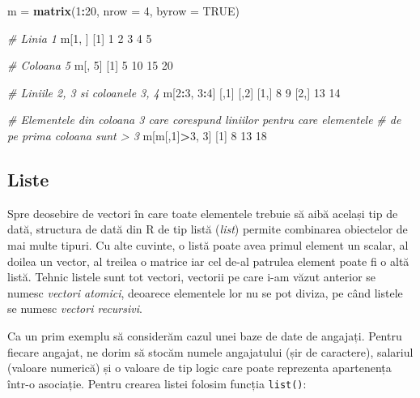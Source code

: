 \documentclass[]{article}
\newenvironment{Shaded}{\begin{snugshade}}{\end{snugshade}}
\newcommand{\KeywordTok}[1]{\textcolor[rgb]{0.13,0.29,0.53}{\textbf{#1}}}
\newcommand{\DataTypeTok}[1]{\textcolor[rgb]{0.13,0.29,0.53}{#1}}
\newcommand{\DecValTok}[1]{\textcolor[rgb]{0.00,0.00,0.81}{#1}}
\newcommand{\StringTok}[1]{\textcolor[rgb]{0.31,0.60,0.02}{#1}}
\newcommand{\CommentTok}[1]{\textcolor[rgb]{0.56,0.35,0.01}{\textit{#1}}}
\newcommand{\OtherTok}[1]{\textcolor[rgb]{0.56,0.35,0.01}{#1}}
\newcommand{\OperatorTok}[1]{\textcolor[rgb]{0.81,0.36,0.00}{\textbf{#1}}}
\newcommand{\NormalTok}[1]{#1}
\begin{document}
\begin{Shaded}
\begin{Highlighting}[]
\NormalTok{m =}\StringTok{ }\KeywordTok{matrix}\NormalTok{(}\DecValTok{1}\OperatorTok{:}\DecValTok{20}\NormalTok{, }\DataTypeTok{nrow =} \DecValTok{4}\NormalTok{, }\DataTypeTok{byrow =} \OtherTok{TRUE}\NormalTok{)}

\CommentTok{# Linia 1}
\NormalTok{m[}\DecValTok{1}\NormalTok{, ]}
\NormalTok{[}\DecValTok{1}\NormalTok{] }\DecValTok{1} \DecValTok{2} \DecValTok{3} \DecValTok{4} \DecValTok{5}

\CommentTok{# Coloana 5}
\NormalTok{m[, }\DecValTok{5}\NormalTok{]}
\NormalTok{[}\DecValTok{1}\NormalTok{]  }\DecValTok{5} \DecValTok{10} \DecValTok{15} \DecValTok{20}

\CommentTok{# Liniile 2, 3 si coloanele 3, 4}
\NormalTok{m[}\DecValTok{2}\OperatorTok{:}\DecValTok{3}\NormalTok{, }\DecValTok{3}\OperatorTok{:}\DecValTok{4}\NormalTok{]}
\NormalTok{     [,}\DecValTok{1}\NormalTok{] [,}\DecValTok{2}\NormalTok{]}
\NormalTok{[}\DecValTok{1}\NormalTok{,]    }\DecValTok{8}    \DecValTok{9}
\NormalTok{[}\DecValTok{2}\NormalTok{,]   }\DecValTok{13}   \DecValTok{14}

\CommentTok{# Elementele din coloana 3 care corespund liniilor pentru care elementele }
\CommentTok{# de pe prima coloana sunt > 3}
\NormalTok{m[m[,}\DecValTok{1}\NormalTok{]}\OperatorTok{>}\DecValTok{3}\NormalTok{, }\DecValTok{3}\NormalTok{]}
\NormalTok{[}\DecValTok{1}\NormalTok{]  }\DecValTok{8} \DecValTok{13} \DecValTok{18}
\end{Highlighting}
\end{Shaded}

\subsection{Liste}\label{liste}

Spre deosebire de vectori în care toate elementele trebuie să aibă
același tip de dată, structura de dată din R de tip listă (\emph{list})
permite combinarea obiectelor de mai multe tipuri. Cu alte cuvinte, o
listă poate avea primul element un scalar, al doilea un vector, al
treilea o matrice iar cel de-al patrulea element poate fi o altă listă.
Tehnic listele sunt tot vectori, vectorii pe care i-am văzut anterior se
numesc \emph{vectori atomici}, deoarece elementele lor nu se pot diviza,
pe când listele se numesc \emph{vectori recursivi}.

Ca un prim exemplu să considerăm cazul unei baze de date de angajați.
Pentru fiecare angajat, ne dorim să stocăm numele angajatului (șir de
caractere), salariul (valoare numerică) și o valoare de tip logic care
poate reprezenta apartenența într-o asociație. Pentru crearea listei
folosim funcția \texttt{list()}:
\end{document}
